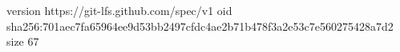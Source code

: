 version https://git-lfs.github.com/spec/v1
oid sha256:701aec7fa65964ee9d53bb2497cfdc4ae2b71b478f3a2e53c7e560275428a7d2
size 67
